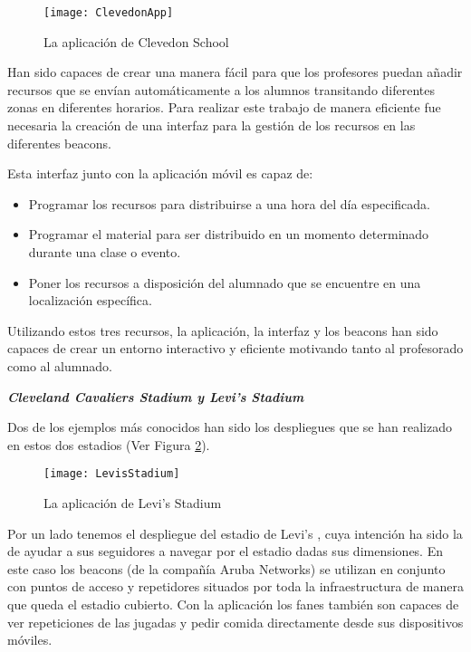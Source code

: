 \begin{figure}[H]
	\centering
	\texttt{[image: ClevedonApp]}
	\caption{La aplicación de Clevedon School}
	\label{fig:clevedonApp}
\end{figure}


Han sido capaces de crear una manera fácil para que los profesores puedan añadir recursos que se envían automáticamente a los alumnos transitando diferentes zonas en diferentes horarios. Para realizar este trabajo de manera eficiente fue necesaria la creación de una interfaz para la gestión de los recursos en las diferentes beacons.


Esta interfaz junto con la aplicación móvil es capaz de: 

\begin{itemize}
\item Programar los recursos para distribuirse a una hora del día especificada. 
\item Programar el material para ser distribuido en un momento determinado durante una clase o evento. 
\item Poner los recursos a disposición del alumnado que se encuentre en una localización específica.
\end{itemize}

Utilizando estos tres recursos, la aplicación, la interfaz y los beacons han sido capaces de crear un entorno interactivo y eficiente motivando tanto al profesorado como al alumnado. 

\vspace{5mm}

\textsl{\textbf{{Cleveland Cavaliers Stadium y Levi's Stadium}}}

\vspace{2mm}

Dos de los ejemplos más conocidos han sido los despliegues que se han realizado en estos dos estadios (Ver Figura \ref{fig:levisStadium}). 

\begin{figure}[H]
	\centering
	\texttt{[image: LevisStadium]}
	\caption{La aplicación de Levi's Stadium}
	\label{fig:levisStadium}
\end{figure}

Por un lado tenemos el despliegue del estadio de Levi's , cuya intención ha sido la de ayudar a sus seguidores a navegar por el estadio dadas sus dimensiones. En este caso los beacons (de la compañía Aruba Networks) se utilizan en conjunto con puntos de acceso y repetidores situados por toda la infraestructura de manera que queda el estadio cubierto. Con la aplicación los fanes también son capaces de ver repeticiones de las jugadas y pedir comida directamente desde sus dispositivos móviles.


